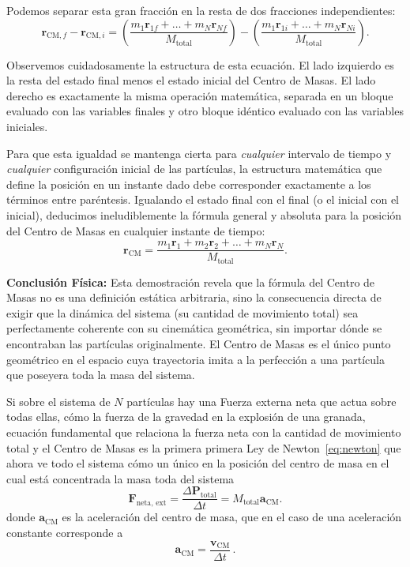 \documentclass[11pt,a4paper]{book}
\begin{document}
Podemos separar esta gran fracción en la resta de dos fracciones independientes:
\begin{equation}
    \boldsymbol{r}_{\text{CM},f} - \boldsymbol{r}_{\text{CM},i} = \left( \frac{m_1\boldsymbol{r}_{1f} + \dots + m_N\boldsymbol{r}_{Nf}}{M_{\text{total}}} \right) - \left( \frac{m_1\boldsymbol{r}_{1i} + \dots + m_N\boldsymbol{r}_{Ni}}{M_{\text{total}}} \right).
\end{equation}

Observemos cuidadosamente la estructura de esta ecuación. El lado izquierdo es la resta del estado final menos el estado inicial del Centro de Masas. El lado derecho es exactamente la misma operación matemática, separada en un bloque evaluado con las variables finales y otro bloque idéntico evaluado con las variables iniciales. 

Para que esta igualdad se mantenga cierta para \textit{cualquier} intervalo de tiempo y \textit{cualquier} configuración inicial de las partículas, la estructura matemática que define la posición en un instante dado debe corresponder exactamente a los términos entre paréntesis. Igualando el estado final con el final (o el inicial con el inicial), deducimos ineludiblemente la fórmula general y absoluta para la posición del Centro de Masas en cualquier instante de tiempo:
\begin{equation}
    \boldsymbol{r}_{\text{CM}} = \frac{m_1\boldsymbol{r}_1 + m_2\boldsymbol{r}_2 + \dots + m_N\boldsymbol{r}_N}{M_{\text{total}}}.
\end{equation}

\textbf{Conclusión Física:}
Esta demostración revela que la fórmula del Centro de Masas no es una definición estática arbitraria, sino la consecuencia directa de exigir que la dinámica del sistema (su cantidad de movimiento total) sea perfectamente coherente con su cinemática geométrica, sin importar dónde se encontraban las partículas originalmente. El Centro de Masas es el único punto geométrico en el espacio cuya trayectoria imita a la perfección a una partícula que poseyera toda la masa del sistema.

Si sobre el sistema de $N$ partículas hay una Fuerza externa neta que actua sobre todas ellas, cómo la fuerza de la gravedad en la explosión de una granada, ecuación fundamental que relaciona la fuerza neta con la cantidad de movimiento total y el Centro de Masas es la primera primera Ley de Newton~\eqref{eq:newton} que ahora ve todo el sistema cómo un único en la posición del centro de masa en el cual está concentrada la masa toda del sistema
\begin{equation}
\label{eq:newtonN}
    \boldsymbol{F}_{\text{neta, ext}} = \frac{\Delta \boldsymbol{P}_{\text{total}}}{\Delta t} = M_{\text{total}} \boldsymbol{a}_{\text{CM}}.
\end{equation}
donde $\boldsymbol{a}_{\text{CM}}$ es la aceleración del centro de masa, que en el caso de una aceleración constante corresponde a
\begin{equation}
    \boldsymbol{a}_{\text{CM}} = \frac{\boldsymbol{v}_{\text{CM}}}{\Delta t}\,.
\end{equation}
\end{document}
